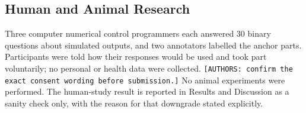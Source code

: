 \subsection{Human and Animal Research}

Three computer numerical control programmers each answered 30 binary questions about simulated outputs, and two annotators labelled the anchor parts. Participants were told how their responses would be used and took part voluntarily; no personal or health data were collected. \texttt{[AUTHORS: confirm the exact consent wording before submission.]} No animal experiments were performed. The human-study result is reported in Results and Discussion as a sanity check only, with the reason for that downgrade stated explicitly.
